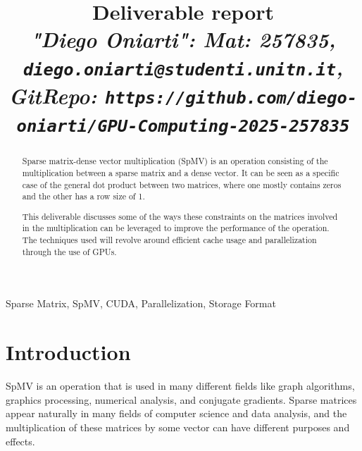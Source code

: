 \documentclass[conference]{IEEEtran}
\begin{document}
\author{}
\title{Deliverable report \\
\footnotesize \textit{"Diego Oniarti": Mat: 257835, \texttt{diego.oniarti@studenti.unitn.it}, GitRepo: \texttt{https://github.com/diego-oniarti/GPU-Computing-2025-257835}}}

\maketitle

\begin{abstract}
% 
Sparse matrix-dense vector multiplication (SpMV) is an operation consisting of the multiplication between a sparse matrix and a dense vector. It can be seen as a specific case of the general dot product between two matrices, where one mostly contains zeros and the other has a row size of 1.

This deliverable discusses some of the ways these constraints on the matrices involved in the multiplication can be leveraged to improve the performance of the operation.\\
The techniques used will revolve around efficient cache usage and parallelization through the use of GPUs.
\end{abstract}

\begin{IEEEkeywords}
Sparse Matrix, SpMV, CUDA, Parallelization, Storage Format
\end{IEEEkeywords}

\section{Introduction}
SpMV is an operation that is used in many different fields like graph algorithms, graphics processing, numerical analysis, and conjugate gradients\cite{ZHUO2011709}. Sparse matrices appear naturally in many fields of computer science and data analysis, and the multiplication of these matrices by some vector can have different purposes and effects.
\end{document}
